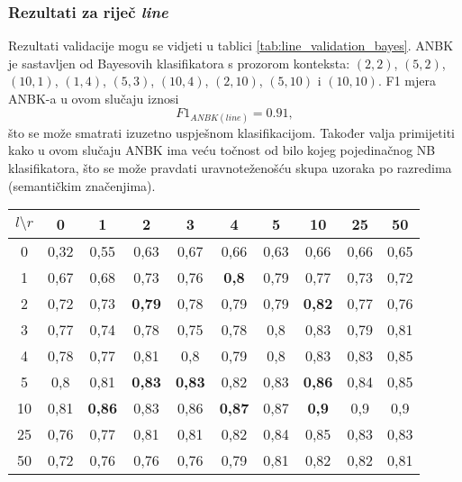 \documentclass[10pt, a4paper]{article}
\begin{document}
\subsubsection{Rezultati za riječ \emph{line}} 
Rezultati validacije mogu se vidjeti u tablici \ref{tab:line_validation_bayes}.
ANBK je sastavljen od Bayesovih klasifikatora s prozorom konteksta: $(2,2)$,
$(5,2)$, $(10,1)$, $(1,4)$, $(5,3)$, $(10,4)$, $(2,10)$, $(5,10)$ i $(10,10)$.
F1 mjera ANBK-a u ovom slučaju iznosi
\begin{equation}
\label{eq:F1_ansambl_line}
F1_{ANBK(line)} = 0.91,
\end{equation}
što se može smatrati izuzetno uspješnom klasifikacijom. 
Također valja primijetiti kako u ovom slučaju ANBK ima veću točnost
od bilo kojeg pojedinačnog NB klasifikatora, što
se može pravdati uravnoteženošću skupa uzoraka po razredima (semantičkim značenjima).
\begin{table*}[!hbtp]
\caption{Validacijom dobivene F1 mjere NB klasifikatora s prozorom konteksta $(l,r)$ za riječ \emph{line}}
\label{tab:line_validation_bayes}
\begin{center}
\begin{tabular}{|c||ccc|ccc|ccc|}
\hline
$l \setminus r$ & 0 & 1 & 2 & 3 & 4 & 5 & 10 & 25 & 50 \\
\hline\hline
0  & 0,32  & 0,55  & 0,63  & 0,67  & 0,66  & 0,63  & 0,66  & 0,66  & 0,65 \\  
1  & 0,67  & 0,68  & 0,73  & 0,76  & \textbf{0,8}   & 0,79  & 0,77  & 0,73  & 0,72 \\ 
2  & 0,72  & 0,73  & \textbf{0,79}  & 0,78  & 0,79  & 0,79  & \textbf{0,82}  & 0,77  & 0,76 \\\hline
3  &  0,77  & 0,74  & 0,78  & 0,75  & 0,78  & 0,8   & 0,83  & 0,79  & 0,81 \\ 
4  & 0,78  & 0,77  & 0,81  & 0,8   & 0,79  & 0,8   & 0,83  & 0,83  & 0,85 \\ 
5  & 0,8   & 0,81  & \textbf{0,83}  & \textbf{0,83}  & 0,82  & 0,83  & \textbf{0,86}  & 0,84  & 0,85 \\\hline 
10 & 0,81  & \textbf{0,86}  & 0,83  & 0,86  & \textbf{0,87}  & 0,87  & \textbf{0,9}   & 0,9   & 0,9  \\
25 & 0,76  & 0,77  & 0,81  & 0,81  & 0,82  & 0,84  & 0,85  & 0,83  & 0,83 \\ 
50 & 0,72  & 0,76  & 0,76  & 0,76  & 0,79  & 0,81  & 0,82  & 0,82  & 0,81 \\ 
\hline
\end{tabular}
\end{center}
\end{table*}
\end{document}
